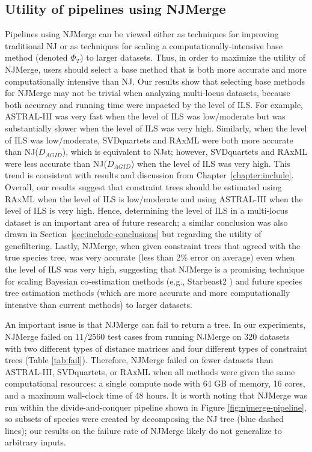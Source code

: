\subsection{Utility of pipelines using NJMerge}
Pipelines using NJMerge can be viewed either as techniques for improving traditional NJ or as techniques for scaling a computationally-intensive base method (denoted $\Phi_T$) to larger datasets.
Thus, in order to maximize the utility of NJMerge, users should select a base method that is both more accurate and more computationally intensive than NJ.
Our results show that selecting base methods for NJMerge may not be trivial when analyzing multi-locus datasets, because both accuracy and running time were impacted by the level of ILS.
For example, ASTRAL-III was very fast when the level of ILS was low/moderate but was substantially slower when the level of ILS was very high.
Similarly, when the level of ILS was low/moderate, SVDquartets and RAxML were both more accurate than NJ($D_{AGID}$), which is equivalent to \gls{NJst}; however, SVDquartets and RAxML were less accurate than NJ($D_{AGID}$) when the level of ILS was very high.
This trend is consistent with results and discussion from Chapter~\ref{chapter:include}.
Overall, our results suggest that constraint trees should be estimated using RAxML when the level of ILS is low/moderate and using ASTRAL-III when the level of ILS is very high.
Hence, determining the level of ILS in a multi-locus dataset is an important area of future research; a similar conclusion was also drawn in Section~\ref{sec:include-conclusions} but regarding the utility of \gls{genefiltering}.
Lastly, NJMerge, when given constraint trees that agreed with the true species tree, was very accurate (less than 2\% error on average) even when the level of ILS was very high, suggesting that NJMerge is a promising technique for scaling Bayesian \gls{co-estimation} methods (e.g., Starbeast2 \cite{ogilvie2017starbeast2}) and future species tree estimation methods (which are more accurate and more computationally intensive than current methods) to larger datasets.

An important issue is that NJMerge can fail to return a tree. 
In our experiments, NJMerge failed on 11/2560 test cases from running NJMerge on 320 datasets with two different types of distance matrices and four different types of constraint trees (Table \ref{tab:fail}).
Therefore, NJMerge failed on fewer datasets than ASTRAL-III, SVDquartets, or RAxML when all methods were given the same computational resources: a single compute node with 64 GB of memory, 16 cores, and a maximum wall-clock time of 48 hours.
It is worth noting that NJMerge was run within the divide-and-conquer pipeline shown in Figure \ref{fig:njmerge-pipeline}, so subsets of species were created by decomposing the NJ tree (blue dashed lines); our results on the failure rate of NJMerge likely do not generalize to arbitrary inputs.

